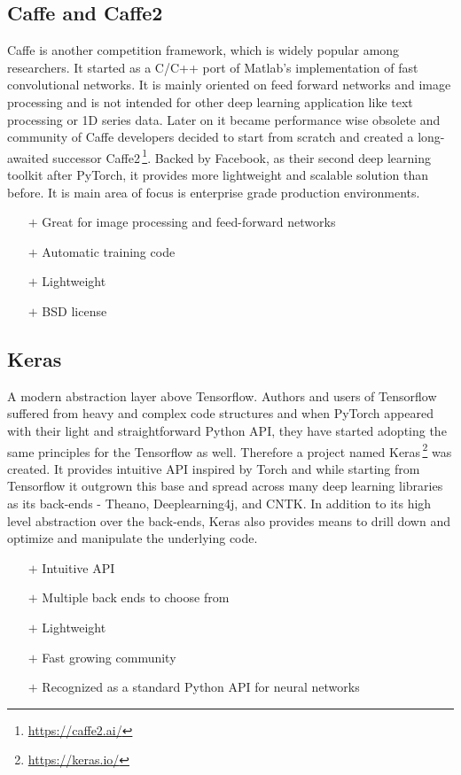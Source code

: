 \subsection{Caffe and Caffe2}

Caffe is another competition framework, which is widely popular among researchers. It started as a C/C++ port of Matlab's implementation of fast convolutional networks. It is mainly oriented on feed forward networks and image processing and is not intended for other deep learning application like text processing or 1D series data. Later on it became performance wise obsolete and community of Caffe developers decided to start from scratch and created a long-awaited successor Caffe2\,\footnote{\url{https://caffe2.ai/}}. Backed by Facebook, as their second deep learning toolkit after PyTorch, it provides more lightweight and scalable solution than before. It is main area of focus is enterprise grade production environments.

\begin{itemize}
    \item[$\boldsymbol{+}$] Great for image processing and feed-forward networks
    \item[$\boldsymbol{+}$] Automatic training code
    \item[$\boldsymbol{+}$] Lightweight
    \item[$\boldsymbol{+}$] BSD license
\end{itemize}

\subsection{Keras}

A modern abstraction layer above Tensorflow. Authors and users of Tensorflow suffered from heavy and complex code structures and when PyTorch appeared with their light and straightforward Python API, they have started adopting the same principles for the Tensorflow as well. Therefore a project named Keras\,\footnote{\url{https://keras.io/}} was created. It provides intuitive API inspired by Torch and while starting from Tensorflow it outgrown this base and spread across many deep learning libraries as its back-ends - Theano, Deeplearning4j, and CNTK. In addition to its high level abstraction over the back-ends, Keras also provides means to drill down and optimize and manipulate the underlying code.

\begin{itemize}
    \item[$\boldsymbol{+}$] Intuitive API
    \item[$\boldsymbol{+}$] Multiple back ends to choose from
    \item[$\boldsymbol{+}$] Lightweight
    \item[$\boldsymbol{+}$] Fast growing community
    \item[$\boldsymbol{+}$] Recognized as a standard Python API for neural networks
\end{itemize}

